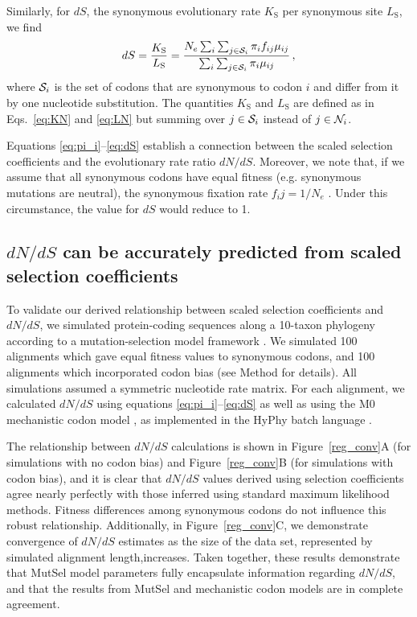 \documentclass[11pt]{article}
\begin{document}
Similarly, for $dS$, the synonymous evolutionary rate $K_\text{S}$ per synonymous site $L_\text{S}$, we find
\begin{equation}\label{eq:dS}
  dS = \frac{K_\text{S}}{L_\text{S}}=\frac{ N_e \sum_i \sum_{j \in {\cal S}_i} \pi_i f_{ij} \mu_{ij} } {\sum_i \sum_{j \in {\cal S}_i} \pi_i \mu_{ij} }\,,
\end{equation}
where ${\cal S}_i$ is the set of codons that are synonymous to codon $i$ and differ from it by one nucleotide substitution. The quantities $K_\text{S}$ and $L_\text{S}$ are defined as in Eqs.~\eqref{eq:KN} and \eqref{eq:LN} but summing over $j\in {\cal S}_i$ instead of $j\in {\cal N}_i$.

Equations \eqref{eq:pi_i}--\eqref{eq:dS} establish a connection between the scaled selection coefficients and the evolutionary rate ratio $dN/dS$. Moreover, we note that, if we assume that all synonymous codons have equal fitness (e.g. synonymous mutations are neutral), the synonymous fixation rate $f_ij = 1/N_e$ \cite{CrowKimura1970}. Under this circumstance, the value for $dS$ would reduce to 1.


\subsection*{$dN/dS$ can be accurately predicted from scaled selection coefficients}

To validate our derived relationship between scaled selection coefficients and $dN/dS$, we simulated protein-coding sequences along a 10-taxon phylogeny according to a mutation-selection model framework \cite{HalpernBruno1998,SellaHirsh2005}. We simulated 100 alignments which gave equal fitness values to synonymous codons, and 100 alignments which incorporated codon bias (see Method for details). All simulations assumed a symmetric nucleotide rate matrix. For each alignment, we calculated $dN/dS$ using equations \eqref{eq:pi_i}--\eqref{eq:dS} as well as using the M0 mechanistic codon model \cite{GoldmanYang1994,NielsenYang1998,Yangetal2000}, as implemented in the HyPhy batch language \cite{KosakovskyPondetal2005}.

The relationship between $dN/dS$ calculations is shown in Figure~\ref{reg_conv}A (for simulations with no codon bias) and Figure~\ref{reg_conv}B (for simulations with codon bias), and it is clear that $dN/dS$ values derived using selection coefficients agree nearly perfectly with those inferred using standard maximum likelihood methods. Fitness differences among synonymous codons do not influence this robust relationship. Additionally, in Figure~\ref{reg_conv}C, we demonstrate convergence of $dN/dS$ estimates as the size of the data set, represented by simulated alignment length,increases. Taken together, these results demonstrate that MutSel model parameters fully encapsulate information regarding $dN/dS$, and that the results from MutSel and mechanistic codon models are in complete agreement.
\end{document}
